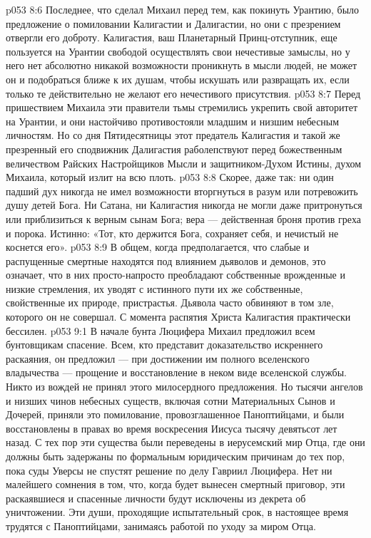 \vs p053 8:6 \pc Последнее, что сделал Михаил перед тем, как покинуть Урантию, было предложение о помиловании Калигастии и Далигастии, но они с презрением отвергли его доброту. Калигастия, ваш Планетарный Принц\hyp{}отступник, еще пользуется на Урантии свободой осуществлять свои нечестивые замыслы, но у него нет абсолютно никакой возможности проникнуть в мысли людей, не может он и подобраться ближе к их душам, чтобы искушать или развращать их, если только те действительно не желают его нечестивого присутствия.
\vs p053 8:7 \pc Перед пришествием Михаила эти правители тьмы стремились укрепить свой авторитет на Урантии, и они настойчиво противостояли младшим и низшим небесным личностям. Но со дня Пятидесятницы этот предатель Калигастия и такой же презренный его сподвижник Далигастия раболепствуют перед божественным величеством Райских Настройщиков Мысли и защитником\hyp{}Духом Истины, духом Михаила, который излит на всю плоть.
\vs p053 8:8 Скорее, даже так: ни один падший дух никогда не имел возможности вторгнуться в разум или потревожить душу детей Бога. Ни Сатана, ни Калигастия никогда не могли даже притронуться или приблизиться к верным сынам Бога; вера --- действенная броня против греха и порока. Истинно: «Тот, кто держится Бога, сохраняет себя, и нечистый не коснется его».
\vs p053 8:9 В общем, когда предполагается, что слабые и распущенные смертные находятся под влиянием дьяволов и демонов, это означает, что в них просто\hyp{}напросто преобладают собственные врожденные и низкие стремления, их уводят с истинного пути их же собственные, свойственные их природе, пристрастья. Дьявола часто обвиняют в том зле, которого он не совершал. С момента распятия Христа Калигастия практически бессилен.
\vs p053 9:1 В начале бунта Люцифера Михаил предложил всем бунтовщикам спасение. Всем, кто представит доказательство искреннего раскаяния, он предложил --- при достижении им полного вселенского владычества --- прощение и восстановление в неком виде вселенской службы. Никто из вождей не принял этого милосердного предложения. Но тысячи ангелов и низших чинов небесных существ, включая сотни Материальных Сынов и Дочерей, приняли это помилование, провозглашенное Паноптийцами, и были восстановлены в правах во время воскресения Иисуса тысячу девятьсот лет назад. С тех пор эти существа были переведены в иерусемский мир Отца, где они должны быть задержаны по формальным юридическим причинам до тех пор, пока суды Уверсы не спустят решение по делу Гавриил  Люцифера. Нет ни малейшего сомнения в том, что, когда будет вынесен смертный приговор, эти раскаявшиеся и спасенные личности будут исключены из декрета об уничтожении. Эти души, проходящие испытательный срок, в настоящее время трудятся с Паноптийцами, занимаясь работой по уходу за миром Отца.
